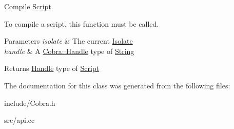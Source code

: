 Compile \hyperlink{class_cobra_1_1_script}{Script}. 

To compile a script, this function must be called.


\begin{DoxyParams}{Parameters}
{\em isolate} & The current \hyperlink{class_cobra_1_1_isolate}{Isolate} \\
\hline
{\em handle} & A \hyperlink{class_cobra_1_1_handle}{Cobra\+::\+Handle} type of \hyperlink{class_cobra_1_1_string}{String}\\
\hline
\end{DoxyParams}
\begin{DoxyReturn}{Returns}
\hyperlink{class_cobra_1_1_handle}{Handle} type of \hyperlink{class_cobra_1_1_script}{Script} 
\end{DoxyReturn}


The documentation for this class was generated from the following files\+:\begin{DoxyCompactItemize}
\item 
include/Cobra.\+h\item 
src/api.\+cc\end{DoxyCompactItemize}
